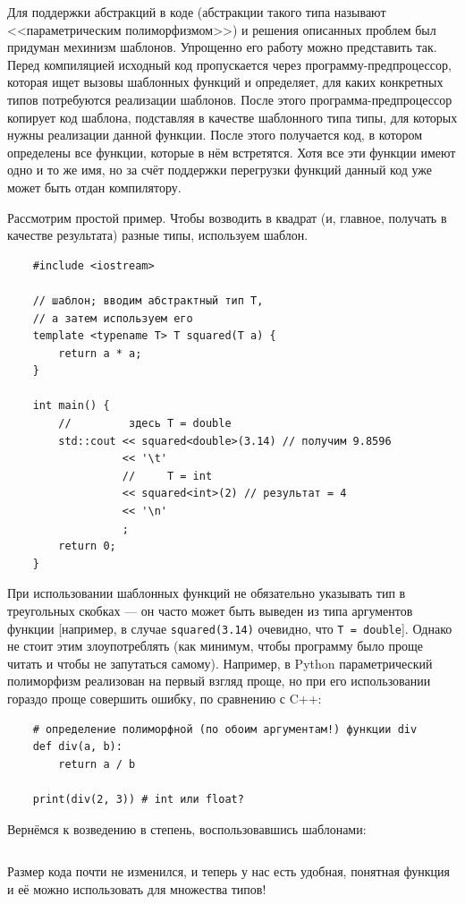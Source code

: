 \documentclass{book}
\begin{document}
Для поддержки абстракций в коде (абстракции такого типа называют <<параметрическим полиморфизмом>>)
и решения описанных проблем был придуман мехинизм шаблонов. Упрощенно его работу можно представить
так. Перед компиляцией исходный код пропускается через программу-предпроцессор, которая ищет вызовы
шаблонных функций и определяет, для каких конкретных типов потребуются реализации шаблонов. После
этого программа-предпроцессор копирует код шаблона, подставляя в качестве шаблонного типа типы, для
которых нужны реализации данной функции. После этого получается код, в котором определены все
функции, которые в нём встретятся. Хотя все эти функции имеют одно и то же имя, но за счёт
поддержки перегрузки функций данный код уже может быть отдан компилятору.

Рассмотрим простой пример.  Чтобы возводить в квадрат (и, главное, получать в качестве результата)
разные типы, используем шаблон.
\begin{verbatim}
    #include <iostream>

    // шаблон; вводим абстрактный тип T,
    // а затем используем его
    template <typename T> T squared(T a) {
        return a * a;
    }

    int main() {
        //         здесь T = double
        std::cout << squared<double>(3.14) // получим 9.8596
                  << '\t'
                  //     T = int
                  << squared<int>(2) // результат = 4
                  << '\n'
                  ;
        return 0;
    }
\end{verbatim}
При использовании шаблонных функций не обязательно указывать тип в треугольных скобках --- он часто
может быть выведен из типа аргументов функции [например, в случае \texttt{squared(3.14)}
очевидно, что \texttt{T = double}]. Однако не стоит этим злоупотреблять (как минимум,
чтобы программу было проще читать и чтобы не запутаться самому).  Например, в Python
параметрический полиморфизм реализован на первый взгляд проще, но при его использовании гораздо
проще совершить ошибку, по сравнению с C++:
\begin{verbatim}
    # определение полиморфной (по обоим аргументам!) функции div
    def div(a, b):
        return a / b

    print(div(2, 3)) # int или float?
\end{verbatim}

Вернёмся к возведению в степень, воспользовавшись шаблонами:
\inputminted{cpp}{pow.cpp}
Размер кода почти не изменился, и теперь у нас есть удобная, понятная функция и её можно
использовать для множества типов!
\end{document}
